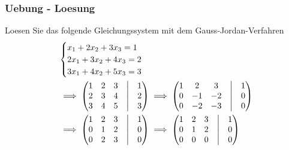 \begin{frame}
    \frametitle{Uebung - Loesung}
    Loesen Sie das folgende Gleichungssystem mit dem Gauss-Jordan-Verfahren
    \begin{align*}
        &\begin{cases}
            x_1 + 2x_2 + 3x_3 = 1 \\
            2x_1 + 3x_2 + 4x_3 = 2 \\
            3x_1 + 4x_2 + 5x_3 = 3
        \end{cases} \\
        &\implies
        \begin{pmatrix}
            1 & 2 & 3 & \bigm| & 1 \\
            2 & 3 & 4 & \bigm| & 2 \\
            3 & 4 & 5 & \bigm| & 3
        \end{pmatrix}
        \implies
        \begin{pmatrix}
            1 & 2  & 3  & \bigm| & 1 \\
            0 & -1 & -2 & \bigm| & 0 \\
            0 & -2 & -3 & \bigm| & 0
        \end{pmatrix} \\
        &\implies
        \begin{pmatrix}
            1 & 2 & 3 & \bigm| & 1 \\
            0 & 1 & 2 & \bigm| & 0 \\
            0 & 2 & 3 & \bigm| & 0
        \end{pmatrix}
        \implies
        \begin{pmatrix}
            1 & 2 & 3 & \bigm| & 1 \\
            0 & 1 & 2 & \bigm| & 0 \\
            0 & 0 & 0 & \bigm| & 0
        \end{pmatrix}
    \end{align*}
\end{frame}